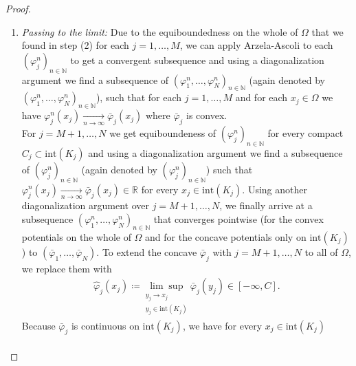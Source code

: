 \documentclass[letterpaper]{amsart}
\newcommand{\RR}{\mathbb{R}}
\newcommand{\NN}{\mathbb{N}}
\newcommand{\dd}{\mathrm{d}}
\theoremstyle{definition}
\begin{document}
\begin{proof}
\begin{enumerate}
\begin{gather*}
	\end{gather*}
	Recalling that in step (3) we got $\varphi_j^n(x_j)\leq A$, with $A$ independent of $x_j$ and $n$, we get the lower bound
	\begin{align*}
		\varphi_j^n(x_j)&\geq A-\int_\Omega \big(A-\varphi_j^n(y)\big) \frac{\dd\beta_x}{\dd\mu_j}(y)\ \dd\mu_j(y)\\
		&\geq A-\Big\|\frac{\dd\beta_x}{\dd\mu_j}\Big\|_{L^\infty(\mu_j)}\int_\Omega \big(A-\varphi_j^n(y)\big) \ \dd\mu_j(y)\\
		&\geq A-L_{C_j}(A-C)
	\end{align*}
	which is independent of $x_j$ and $n$ (but still depends on $C_j$).
	\item \textit{Passing to the limit:}
	Due to the equiboundedness on the whole of $\Omega$ that we found in step (2) for each $j=1,\dots,M$, we can apply Arzela-Ascoli to each $(\varphi_j^n)_{n\in\NN}$ to get a convergent subsequence and using a diagonalization argument we find a subsequence of  $(\varphi_1^n,\dots,\varphi_N^n)_{n\in\NN}$ (again denoted by $(\varphi_1^n,\dots,\varphi_N^n)_{n\in\NN}$), such that for each $j=1,\dots,M$ and for each $x_j\in\Omega$ we have $\varphi_j^n(x_j)\underset{n\rightarrow\infty}{\longrightarrow}\bar\varphi_j(x_j)$ where $\bar\varphi_j$ is convex.\\
	For $j=M+1,\dots,N$ we get equiboundeness of $(\varphi_j^n)_{n\in\NN}$ for every compact $C_j\subset\text{int}(K_j)$ and using a diagonalization argument we find a subsequence of $(\varphi_j^n)_{n\in\NN}$ (again denoted by $(\varphi_j^n)_{n\in\NN}$) such that $\varphi_j^n(x_j)\underset{n\rightarrow\infty}{\longrightarrow}\bar\varphi_j(x_j)\in\RR$ for every $x_j\in\text{int}(K_j)$. Using another diagonalization argument over $j=M+1,\dots,N$, we finally arrive at a subsequence $(\varphi_1^n,\dots,\varphi_N^n)_{n\in\NN}$ that converges pointwise (for the convex potentials on the whole of $\Omega$ and for the concave potentials only on $\text{int}(K_j)$) to $(\bar\varphi_1,\dots,\bar\varphi_N)$. To extend the concave $\bar\varphi_j$ with $j=M+1,\dots,N$ to all of $\Omega$, we replace them with
	\begin{gather*}
		\hat\varphi_j(x_j)\coloneqq\underset{\substack{y_j\rightarrow x_j\\ y_j\in\text{int}(K_j)}}{\lim\sup}\bar\varphi_j(y_j)\in[-\infty,C].
	\end{gather*}
	Because $\bar\varphi_j$ is continuous on $\text{int}(K_j)$, we have for every $x_j\in \text{int}(K_j)$
	\begin{gather*}

\end{gather*}
\end{enumerate}
\end{proof}
\end{document}
